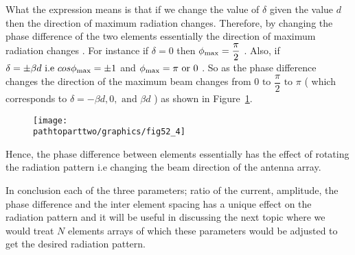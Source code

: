 What the expression means is that if we change the value of $\delta $ given the value $d $ then the direction of maximum radiation changes. Therefore, by changing the phase difference of the two elements essentially the direction of maximum radiation changes . For instance if $ \delta = 0 $ then $ \phi_{\textnormal{max}} = \dfrac{ \pi }{ 2 } $ . Also, if $ \delta = \pm \beta d \text{ i.e } cos\phi_{\textnormal{max}} = \pm 1 $ and $ \phi_{\textnormal{max}} = \pi \text{ or } 0 $ . So as the phase difference changes the direction of the maximum beam changes from $ 0 \text{ to } \dfrac{ \pi }{ 2 } \text{ to } \pi $ ( which corresponds to $ \delta = - \beta d , 0 , \text{ and } \beta d $ ) as shown in Figure~\ref{52.4}.
\begin{figure}[h]
\centering
\texttt{[image: \\pathtoparttwo/graphics/fig52\_4]}
\caption{}
\label{52.4}
\end{figure}

Hence, the phase difference between elements essentially has the effect of rotating the radiation pattern i.e changing the beam direction of the antenna array.

In conclusion each of the three parameters; ratio of the  current, amplitude, the phase difference and the inter element spacing has a unique effect on the radiation pattern and it will be useful in discussing the next topic where we would treat $ N $ elements arrays of which these parameters would be adjusted to get the desired radiation pattern.